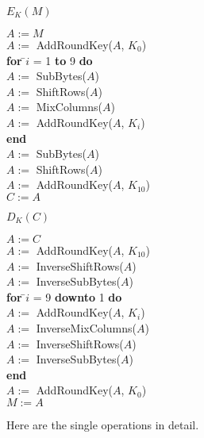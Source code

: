\begin{minipage}{.5\textwidth}
  $E_K(M)$
  \begin{tabbing}
    $A := M$\\
    $A :=$ AddRoundKey($A$, $K_0$)\\
    \textbf{for} \=$i$ = 1 \textbf{to} 9 \textbf{do}\\
    \>$A :=$ SubBytes($A$)\\
    \>$A :=$ ShiftRows($A$)\\
    \>$A :=$ MixColumns($A$)\\
    \>$A :=$ AddRoundKey($A$, $K_i$)\\
    \textbf{end}\\
    $A :=$ SubBytes($A$)\\
    $A :=$ ShiftRows($A$)\\
    $A :=$ AddRoundKey($A$, $K_{10}$)\\
    $C := A$ 
\end{tabbing}
\end{minipage}
\begin{minipage}{.5\textwidth}
$D_K(C)$
  \begin{tabbing}
    $A := C$\\
    $A :=$ AddRoundKey($A$, $K_{10}$)\\
    $A :=$ InverseShiftRows($A$)\\
    $A :=$ InverseSubBytes($A$)\\
    \textbf{for} \=$i$ = 9 \textbf{downto} 1 \textbf{do}\\
    \>$A :=$ AddRoundKey($A$, $K_i$)\\
    \>$A :=$ InverseMixColumns($A$)\\
    \>$A :=$ InverseShiftRows($A$)\\
    \>$A :=$ InverseSubBytes($A$)\\
    \textbf{end}\\
    $A :=$ AddRoundKey($A$, $K_0$)\\
    $M := A$ 
  \end{tabbing}
\end{minipage}

Here are the single operations in detail.  

